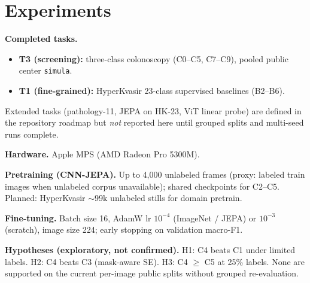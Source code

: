 \section{Experiments}
\label{sec:experiments}

\textbf{Completed tasks.}
\begin{itemize}
  \item \textbf{T3 (screening):} three-class colonoscopy (C0--C5, C7--C9), pooled public center \texttt{simula}.
  \item \textbf{T1 (fine-grained):} HyperKvasir 23-class supervised baselines (B2--B6).
\end{itemize}
Extended tasks (pathology-11, JEPA on HK-23, ViT linear probe) are defined in the repository roadmap but \emph{not} reported here until grouped splits and multi-seed runs complete.

\textbf{Hardware.} Apple MPS (AMD Radeon Pro 5300M).

\textbf{Pretraining (CNN-JEPA).} Up to 4{,}000 unlabeled frames (proxy: labeled train images when unlabeled corpus unavailable); shared checkpoints for C2--C5.
Planned: HyperKvasir $\sim$99k unlabeled stills for domain pretrain.

\textbf{Fine-tuning.} Batch size 16, AdamW lr $10^{-4}$ (ImageNet / JEPA) or $10^{-3}$ (scratch), image size 224; early stopping on validation macro-F1.

\textbf{Hypotheses (exploratory, not confirmed).}
H1: C4 beats C1 under limited labels.
H2: C4 beats C3 (mask-aware SE).
H3: C4 $\geq$ C5 at 25\% labels.
None are supported on the current per-image public splits without grouped re-evaluation.
